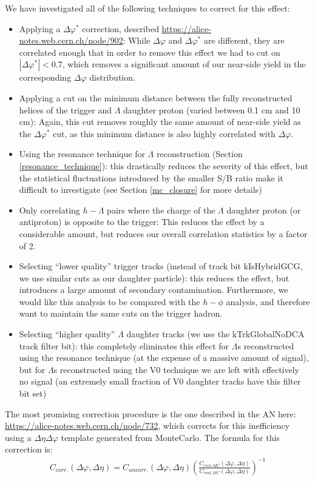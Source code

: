 \documentclass[ALICE,manyauthors]{ALICE_analysis_notes}
\begin{document}
We have investigated all of the following techniques to correct for this effect:
\begin{itemize}
\item Applying a $\Delta\varphi^{*}$ correction, described \href{here}{https://alice-notes.web.cern.ch/node/902}: While $\Delta\varphi$ and $\Delta\varphi^{*}$ are different, they are correlated enough that in order to remove this effect we had to cut on $|\Delta\varphi^{*}| < 0.7$, which removes a significant amount of our near-side yield in the corresponding $\Delta\varphi$ distribution.
\item Applying a cut on the minimum distance between the fully reconstructed helices of the trigger and $\Lambda$ daughter proton (varied between 0.1 cm and 10 cm): Again, this cut removes roughly the same amount of near-side yield as the $\Delta\varphi^{*}$ cut, as this minimum distance is also highly correlated with $\Delta\varphi$.
\item Using the resonance technique for $\Lambda$ reconstruction (Section \ref{resonance_technique}): this drastically reduces the severity of this effect, but the statistical fluctuations introduced by the smaller S/B ratio make it difficult to investigate (see Section \ref{mc_closure} for more details)
\item Only correlating $h-\Lambda$ pairs where the charge of the $\Lambda$ daughter proton (or antiproton) is opposite to the trigger: This reduces the effect by a considerable amount, but reduces our overall correlation statistics by a factor of 2.
\item Selecting ``lower quality'' trigger tracks (instead of track bit kIsHybridGCG, we use similar cuts as our daughter particle): this reduces the effect, but introduces a large amount of secondary contamination. Furthermore, we would like this analysis to be compared with the $h-\phi$ analysis, and therefore want to maintain the same cuts on the trigger hadron.
\item Selecting ``higher quality''  $\Lambda$ daughter tracks (we use the kTrkGlobalNoDCA track filter bit): this completely eliminates this effect for $\Lambda$s reconstructed using the resonance technique (at the expense of a massive amount of signal), but for $\Lambda$s reconstructed using the V0 technique we are left with effectively no signal (an extremely small fraction of V0 daughter tracks have this filter bit set)
\end{itemize}

The most promising correction procedure is the one described in the AN here: \url{https://alice-notes.web.cern.ch/node/732}, which corrects for this inefficiency using a $\Delta\eta\Delta\varphi$ template generated from MonteCarlo. The formula for this correction is:
\begin{align*}
	C_{corr.}(\Delta\varphi, \Delta\eta) = C_{uncorr.}(\Delta\varphi, \Delta\eta)(\frac{C_{reco. MC}(\Delta\varphi, \Delta\eta)}{C_{real. MC}(\Delta\varphi, \Delta\eta)})^{-1}
\end{align*}
\end{document}
